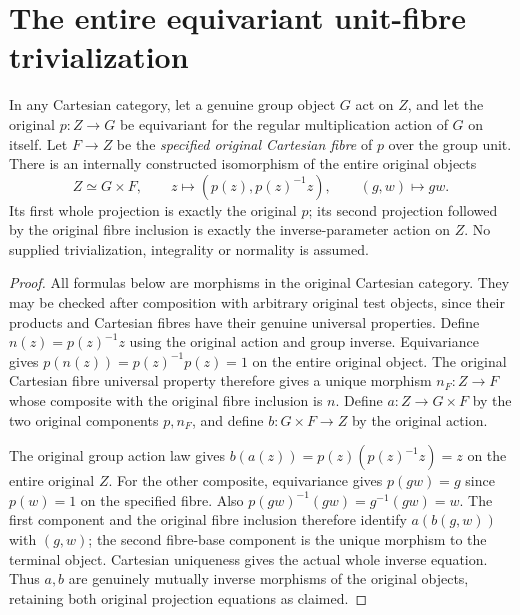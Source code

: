 \section{The entire equivariant unit-fibre trivialization}
\label{sec:equivariant-group-fibre-trivialization}

\begin{theorem}
\label{thm:equivariant-group-fibre-trivialization}
\leanok
In any Cartesian category, let a genuine group object $G$ act
on $Z$, and let the original $p:Z\to G$ be equivariant for
the regular multiplication action of $G$ on itself.
Let $F\to Z$ be the \emph{specified original Cartesian fibre}
of $p$ over the group unit. There is an internally constructed
isomorphism of the entire original objects
\[
 Z\simeq G\times F,
 \qquad z\longmapsto (p(z),p(z)^{-1}z),
 \qquad (g,w)\longmapsto gw.
\]
Its first whole projection is exactly the original $p$;
its second projection followed by the original fibre inclusion
is exactly the inverse-parameter action on $Z$.
No supplied trivialization, integrality or normality is assumed.
\end{theorem}

\begin{proof}
All formulas below are morphisms in the original Cartesian
category. They may be checked after composition with arbitrary
original test objects, since their products and Cartesian
fibres have their genuine universal properties.
Define $n(z)=p(z)^{-1}z$ using the original action and group
inverse. Equivariance gives
$p(n(z))=p(z)^{-1}p(z)=1$ on the entire original object.
The original Cartesian fibre universal property therefore
gives a unique morphism $n_F:Z\to F$ whose composite with
the original fibre inclusion is $n$. Define
$a:Z\to G\times F$ by the two original components $p,n_F$,
and define $b:G\times F\to Z$ by the original action.

The original group action law gives
$b(a(z))=p(z)(p(z)^{-1}z)=z$ on the entire original $Z$.
For the other composite, equivariance gives $p(gw)=g$
since $p(w)=1$ on the specified fibre. Also
$p(gw)^{-1}(gw)=g^{-1}(gw)=w$. The first component and the
original fibre inclusion therefore identify $a(b(g,w))$
with $(g,w)$; the second fibre-base component is the unique
morphism to the terminal object. Cartesian uniqueness gives
the actual whole inverse equation. Thus $a,b$ are genuinely
mutually inverse morphisms of the original objects, retaining
both original projection equations as claimed.
\end{proof}
